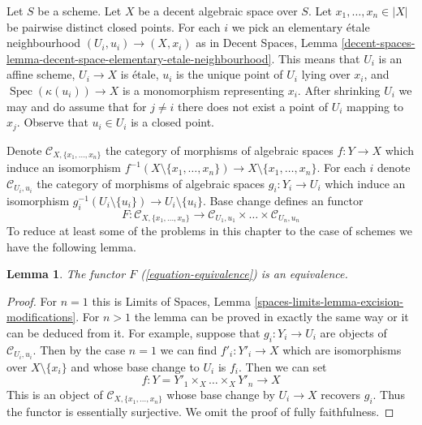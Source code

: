 \documentclass{stacks-project}
\theoremstyle{plain}
\newtheorem{lemma}[subsection]{Lemma}
\theoremstyle{definition}
\theoremstyle{remark}
\numberwithin{equation}{subsection}
\def\Spec{\mathop{\mathrm{Spec}}}
\begin{document}
\noindent
Let $S$ be a scheme. Let $X$ be a decent algebraic space over $S$.
Let $x_1, \ldots, x_n \in |X|$ be pairwise distinct closed points.
For each $i$ we pick an elementary \'etale neighbourhood
$(U_i, u_i) \to (X, x_i)$ as in Decent Spaces, Lemma
\ref{decent-spaces-lemma-decent-space-elementary-etale-neighbourhood}.
This means that $U_i$ is an affine scheme, $U_i \to X$ is \'etale,
$u_i$ is the unique point of $U_i$ lying over $x_i$, and
$\Spec(\kappa(u_i)) \to X$ is a monomorphism representing $x_i$.
After shrinking $U_i$ we may and do assume that for $j \not = i$
there does not exist a point of $U_i$ mapping to $x_j$.
Observe that $u_i \in U_i$ is a closed point.

\medskip\noindent
Denote $\mathcal{C}_{X, \{x_1, \ldots, x_n\}}$ the category of
morphisms of algebraic spaces $f : Y \to X$ which induce an isomorphism
$f^{-1}(X \setminus \{x_1, \ldots, x_n\}) \to X \setminus \{x_1, \ldots, x_n\}$.
For each $i$ denote $\mathcal{C}_{U_i, u_i}$ the category of
morphisms of algebraic spaces $g_i : Y_i \to U_i$ which induce an
isomorphism $g_i^{-1}(U_i \setminus \{u_i\}) \to U_i \setminus \{u_i\}$.
Base change defines an functor
\begin{equation}
\label{equation-equivalence}
F :
\mathcal{C}_{X, \{x_1, \ldots, x_n\}}
\longrightarrow
\mathcal{C}_{U_1, u_1} \times \ldots \times \mathcal{C}_{U_n, u_n}
\end{equation}
To reduce at least some of the problems in this chapter to the case
of schemes we have the following lemma.

\begin{lemma}
\label{lemma-equivalence}
The functor $F$ (\ref{equation-equivalence}) is an equivalence.
\end{lemma}

\begin{proof}
For $n = 1$ this is Limits of Spaces, Lemma
\ref{spaces-limits-lemma-excision-modifications}.
For $n > 1$ the lemma can be proved in exactly the same way or it
can be deduced from it. For example, suppose that
$g_i : Y_i \to U_i$ are objects of $\mathcal{C}_{U_i, u_i}$.
Then by the case $n = 1$ we can find $f'_i : Y'_i \to X$
which are isomorphisms over $X \setminus \{x_i\}$ and whose
base change to $U_i$ is $f_i$. Then we can set
$$
f : Y = Y'_1 \times_X \ldots \times_X Y'_n \to X
$$
This is an object of $\mathcal{C}_{X, \{x_1, \ldots, x_n\}}$
whose base change by $U_i \to X$ recovers $g_i$. Thus the functor
is essentially surjective. We omit the proof of
fully faithfulness.
\end{proof}
\end{document}
